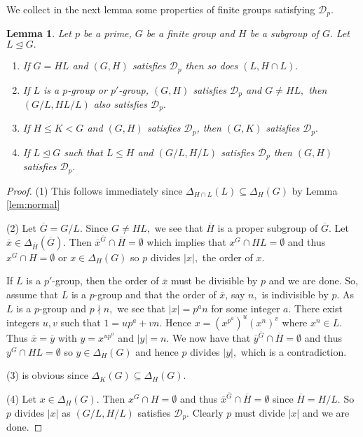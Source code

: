 \documentclass[12pt]{amsart}
\newtheorem{lemma}[theorem]{Lemma}
\theoremstyle{remark}
\numberwithin{equation}{section}
\begin{document}
We collect in the next lemma some properties of finite groups satisfying $\mathcal{D}_p$.

\begin{lemma}\label{D-property} Let $p$ be a prime, $G$ be a finite group and $H$ be a subgroup of $G.$ Let $L\unlhd G.$
\begin{enumerate}[$(1)$]
\item  If $G=HL$ and $(G,H)$ satisfies $\mathcal{D}_p$ then so does $(L,H\cap L).$

\item If $L$ is a $p$-group or $p'$-group, $(G,H)$ satisfies $\mathcal{D}_p$ and $G\neq HL,$ then $(G/L,HL/L)$ also satisfies $\mathcal{D}_p.$

\item If $H\le K< G$ and $(G,H)$ satisfies $\mathcal{D}_p$, then $(G,K)$ satisfies $\mathcal{D}_p.$

\item If $L\unlhd G$ such that $L\leq H$ and $(G/L,H/L)$ satisfies $\mathcal{D}_p$ then $(G,H)$ satisfies $\mathcal{D}_p.$
\end{enumerate}
\end{lemma}

\begin{proof}
(1) This follows immediately since $\Delta_{H\cap L}(L)\subseteq \Delta_H(G)$ by Lemma \ref{lem:normal}

\medskip
(2) Let $\overline{G}=G/L.$ Since $G\neq HL,$ we see that $\overline{H}$ is a proper subgroup of $\overline{G}.$ Let $\overline{x}\in\Delta_{\overline{H}}(\overline{G}).$ Then $\overline{x}^{\overline{G}}\cap \overline{H}=\emptyset$ which implies that $x^G\cap HL=\emptyset$ and thus $x^G\cap H=\emptyset$ or $x\in\Delta_H(G)$ so $p$ divides $|x|,$ the order of $x.$

If $L$ is a $p'$-group, then the order of $\overline{x}$ must be divisible by $p$ and we are done. So, assume that $L$ is a $p$-group and that the order of $\overline{x}$, say $n,$ is indivisible by $p$. As $L$ is a $p$-group and $p\nmid n,$ we see that $|x|=p^an$ for some integer $a.$ There exist integers $u,v$ such that $1=up^a+vn.$ Hence $x=(x^{p^a})^u(x^n)^v$ where $x^n\in L.$ Thus $\overline{x}=\overline{y}$ with $y=x^{up^a}$ and $|y|=n.$ We now have that $\overline{y}^{\overline{G}}\cap \overline{H}=\emptyset$ and thus $y^G\cap HL=\emptyset$ so $y\in\Delta_H(G)$ and hence $p$ divides $|y|,$ which is a contradiction.

\medskip

(3) is obvious since $\Delta_K(G)\subseteq \Delta_H(G).$

\medskip
(4) Let $x\in\Delta_H(G).$ Then $x^G\cap H=\emptyset$ and thus $\overline{x}^{\overline{G}}\cap \overline{H}=\emptyset$ since $\overline{H}=H/L.$ So $p$ divides $|x|$ as  $(G/L,H/L)$ satisfies $\mathcal{D}_p$. Clearly $p$ must divide $|x|$ and we are done.
\end{proof}
\end{document}
